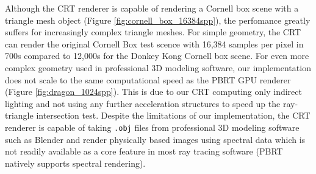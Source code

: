 \documentclass[../main.tex]{subfiles}
\begin{document}
Although the CRT renderer is capable of rendering a Cornell box scene with a
triangle mesh object (Figure \ref{fig:cornell_box_16384spp}), the perfomance greatly suffers for increasingly complex
triangle meshes. For simple geometry, the CRT can render the original Cornell Box
test scence with 16,384 samples per pixel in 700s compared to 12,000s for the
Donkey Kong Cornell box scene. For even more complex geometry used in professional
3D modeling software, our implementation does not scale to the same computational
speed as the PBRT GPU renderer (Figure \ref{fig:dragon_1024spp}). This is due to our CRT computing
only indirect lighting and not using any further acceleration structures to speed up the
ray-triangle intersection test. Despite the limitations of our implementation, the CRT
renderer is capable of taking \texttt{.obj} files from professional 3D modeling software
such as Blender and render physically based images using spectral data which is not readily
available as a core feature in most ray tracing software (PBRT natively supports spectral
rendering).

\ifSubfilesClassLoaded{%
    \nocite{*}
    \twocolumn
}{}
\end{document}
